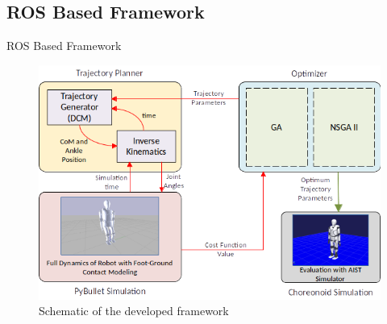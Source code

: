 \documentclass[aspectratio=169,t,xcolor=table]{beamer}
\begin{document}
\subsection{ROS Based Framework}
\begin{frame}{ROS Based Framework}
    \begin{figure}
                \centering
                \includegraphics[height = 0.6\textheight]{lib/logos/framework.png}
                \caption{Schematic of the developed framework}
    \end{figure}
\end{frame}
\end{document}
